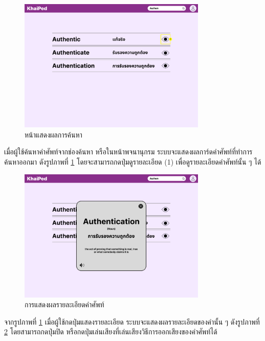 \documentclass[12pt,oneside,openright,a4paper]{cpe-thai-project}
\begin{document}
\pagebreak
\begin{figure}[!h]\centering
	\includegraphics[width=0.8\textwidth, keepaspectratio=true]{image/chap3/ui/dict/Dictionary - Search Word.png}
	\caption{หน้าแสดงผลการค้นหา}\label{fig:UI_DictionarySearch}
\end{figure}
\hspace{1cm}
เมื่อผู้ใช้ค้นหาคำศัพท์จากช่องค้นหา หรือในหน้าพจนานุกรม ระบบจะแสดงผลการ์ดคำศัพท์ที่ทำการค้นหาออกมา 
ดังรูปภาพที่ \ref{fig:UI_DictionarySearch} โดยจะสามารถกดปุ่มดูรายละเอียด (1) เพื่อดูรายละเอียดคำศัพท์นั้น ๆ ได้

\begin{figure}[!h]\centering
	\includegraphics[width=0.8\textwidth, keepaspectratio=true]{image/chap3/ui/dict/Dictionary - View Word.png}
	\caption{การแสดงผลรายละเอียดคำศัพท์}\label{fig:UI_DictionaryView}
\end{figure}
\hspace{1cm}
จากรูปภาพที่ \ref{fig:UI_DictionarySearch} เมื่อผู้ใช้กดปุ่มแสดงรายละเอียด ระบบจะแสดงผลรายละเอียดของคำนั้น ๆ ดังรูปภาพที่ \ref{fig:UI_DictionaryView} 
โดยสามารถกดปุ่มปิด หรือกดปุ่มเล่นเสียงที่เล่นเสียงวิธีการออกเสียงของคำศัพท์ได้ 
\end{document}
